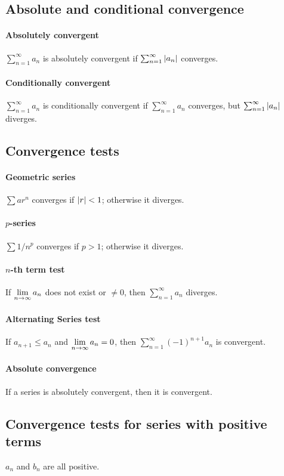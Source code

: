 \documentclass[a4paper]{article}
\begin{document}
\begin{multicols*}{3}
    \subsection*{Absolute and conditional convergence}
      \paragraph{Absolutely convergent}
        $\sum_{n=1}^\infty a_n$ is absolutely convergent if $\sum_{n=1}^\infty \left\lvert a_n\right\rvert$ converges.
      \paragraph{Conditionally convergent}
        $\sum_{n=1}^\infty a_n$ is conditionally convergent if $\sum_{n=1}^\infty a_n$ converges, but $\sum_{n=1}^\infty \left\lvert a_n\right\rvert$ diverges.
    \subsection*{Convergence tests}
      \paragraph{Geometric series}
        $\sum ar^n$ converges if $\left\lvert r\right\rvert < 1$; otherwise it diverges.
      \paragraph{$p$-series}
        $\sum 1/n^p$ converges if $p > 1$; otherwise it diverges.
      \paragraph{$n$-th term test}
        If $\displaystyle \lim_{n \rightarrow \infty} a_n$ does not exist or $\neq 0$, then $\sum_{n=1}^\infty a_n$ diverges.
      \paragraph{Alternating Series test}
        If $a_{n+1} \leq a_n$ and $\displaystyle \lim_{n \rightarrow \infty} a_n = 0$, then $\sum_{n=1}^\infty (-1)^{n+1} a_n$ is convergent.
      \paragraph{Absolute convergence}
        If a series is absolutely convergent, then it is convergent.
\pagebreak
    \subsection*{Convergence tests for series with positive terms}
      $a_n$ and $b_n$ are all positive.

\end{multicols*}
\end{document}
